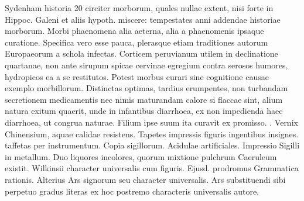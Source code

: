 \pstart Sydenham\protect{} historia 20 circiter morborum, quales nullae extent, nisi forte in Hippoc. Galeni et aliis hypoth. miscere: tempestates anni addendae historiae morborum. Morbi phaenomena alia   aeterna, alia a phaenomenis ipsaque curatione. Specifica vero esse pauca, plerasque etiam traditiones autorum Europaeorum a schola infectas. Corticem peruvianum\protect{} utilem in declinatione quartanae\protect{}, non ante sirupum spicae cervinae egregium contra serosos humores, hydropicos ea a se restitutos. Potest morbus curari sine cognitione causae exemplo morbillorum. Distinctas optimas, tardius erumpentes, non turbandam secretionem medicamentis nec nimis maturandam calore si flaccae sint, alium natura exitum quaerit, unde in infantibus diarrhoea\protect{}, ex non impedienda haec diarrhoea\protect{}, ut congrua naturae. Filium ipse suum ita curavit ex promisso.\pend 
\pstart {}. Vernix Chinensium\protect{}, aquae calidae resistens. Tapetes impressis figuris ingentibus insignes.  taffetas per instrumentum. Copia sigillorum. Acidulae artificiales. Impressio Sigilli in metallum. Duo liquores incolores, quorum mixtione pulchrum Caeruleum\protect{} existit.\pend 
\pstart Wilkinsii\protect{} character universalis cum figuris. Ejusd. prodromus Grammatica rationis. Alterius Ars signorum seu character universalis. Ars substituendi sibi perpetuo  gradus literas ex hoc postremo characteris universalis autore.\pend 
